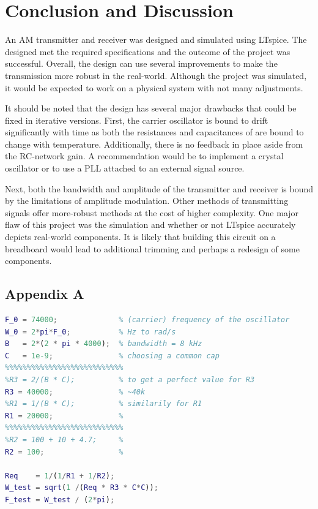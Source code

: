 \documentclass[11pt,letter,notitlepage]{article}
\begin{document}
	\section{Conclusion and Discussion}
	An AM transmitter and receiver was designed and simulated using LTspice. The designed met the required specifications and the outcome of the project was successful. Overall, the design can use several improvements to make the transmission more robust in the real-world. Although the project was simulated, it would be expected to work on a physical system with not many adjustments.
	
	It should be noted that the design has several major drawbacks that could be fixed in iterative versions. First, the carrier oscillator is bound to drift significantly with time as both the resistances and capacitances of are bound to change with temperature. Additionally, there is no feedback in place aside from the RC-network gain. A recommendation would be to implement a crystal oscillator or to use a PLL attached to an external signal source.
	
	Next, both the bandwidth and amplitude of the transmitter and receiver is bound by the limitations of amplitude modulation. Other methods of transmitting signals offer more-robust methods at the cost of higher complexity. One major flaw of this project was the simulation and whether or not LTspice accurately depicts real-world components. It is likely that building this circuit on a breadboard would lead to additional trimming and perhaps a redesign of some components.

	
	
	
	\clearpage
	\subsection*{Appendix A}
\noindent\begin{lstlisting}[language=matlab, caption={\noindent MATLAB code for iterating over component values for the high-Q bandpass filter.},label={lst:highqbpf}]
F_0 = 74000;              % (carrier) frequency of the oscillator
W_0 = 2*pi*F_0;           % Hz to rad/s
B   = 2*(2 * pi * 4000);  % bandwidth = 8 kHz
C   = 1e-9;               % choosing a common cap
%%%%%%%%%%%%%%%%%%%%%%%%%%%
%R3 = 2/(B * C);          % to get a perfect value for R3
R3 = 40000;               % ~40k
%R1 = 1/(B * C);          % similarily for R1
R1 = 20000;               %
%%%%%%%%%%%%%%%%%%%%%%%%%%% 
%R2 = 100 + 10 + 4.7;     %
R2 = 100;                 %

Req    = 1/(1/R1 + 1/R2);
W_test = sqrt(1 /(Req * R3 * C*C));
F_test = W_test / (2*pi);
\end{lstlisting}
\end{document}
